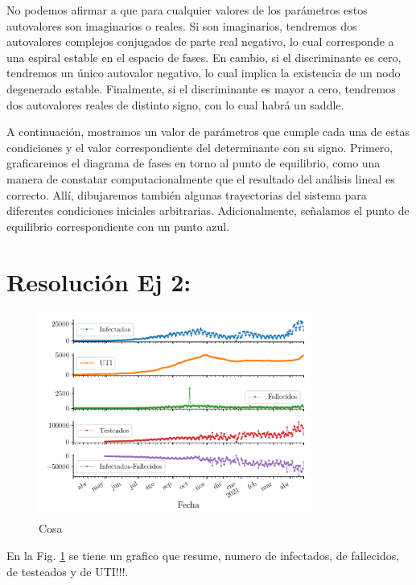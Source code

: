 \documentclass[twocolumn,aps,prl]{revtex4-1}
\begin{document}
No podemos afirmar a que para cualquier valores de los parámetros estos autovalores son imaginarios o reales. Si son imaginarios, tendremos dos autovalores complejos conjugados de parte real negativo, lo cual corresponde a una espiral estable en el espacio de fases. En cambio, si el discriminante es cero, tendremos un único autovalor negativo, lo cual implica la existencia de un nodo degenerado estable. Finalmente, si el discriminante es mayor a cero, tendremos dos autovalores reales de distinto signo, con lo cual habrá un saddle.

A continuación, mostramos un valor de parámetros que cumple cada una de estas condiciones y el valor correspondiente del determinante con su signo. Primero, graficaremos el diagrama de fases en torno al punto de equilibrio, como una manera de constatar computacionalmente que el resultado del análisis lineal es correcto. Allí, dibujaremos también algunas trayectorias del sistema para diferentes condiciones iniciales arbitrarias. Adicionalmente, señalamos el punto de equilibrio correspondiente con un punto azul.


\section{Resolución Ej 2:}

\begin{figure}[!ht]
  \centering
    \includegraphics[width = 0.8\textwidth]{figuras/ex02-resumen.pdf}
    \caption{Cosa}
    \label{fig:ex02Resumen}
\end{figure}

En la Fig. \ref{fig:ex02Resumen} se tiene un grafico que resume, numero de infectados, de fallecidos, de testeados y de UTI!!!.
\end{document}
